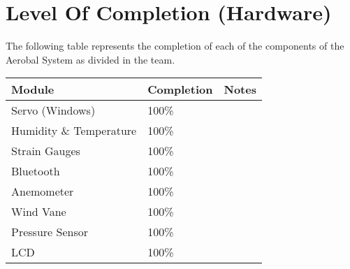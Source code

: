 \section{Level Of Completion (Hardware)}

	The following table represents the completion of each of the components of the Aerobal System as divided in the team.
	\\

	\noindent
	\renewcommand{\arraystretch}{1.5}
	\begin{tabular}{|p{5.0cm}|p{2.5cm}|p{8.0cm}|}
		\hline
			\textbf{Module} & \textbf{Completion} & \textbf{Notes}\\
		\hline
			Servo (Windows) & 100\% & \\
		\hline
			Humidity \& Temperature & 100\% & \\
		\hline
			Strain Gauges & 100\% & \\
		\hline
			Bluetooth & 100\% & \\
		\hline
			Anemometer & 100\% & \\
		\hline
			Wind Vane & 100\% & \\
		\hline
			Pressure Sensor & 100\% & \\
		\hline
			LCD &  100\% & \\
		\hline
	\end{tabular} \\

\newpage
